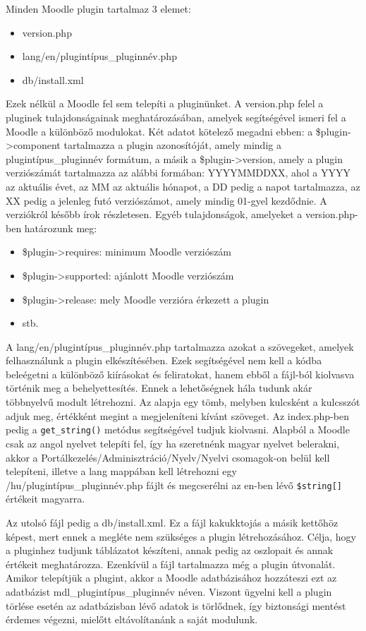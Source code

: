 Minden Moodle plugin tartalmaz 3 elemet:
\begin{itemize}
    \item version.php
    \item lang/en/plugintípus\_pluginnév.php
    \item db/install.xml
\end{itemize}

Ezek nélkül a Moodle fel sem telepíti a pluginünket. A version.php felel a pluginek tulajdonságainak meghatározásában, amelyek segítségével ismeri fel a Moodle a különböző modulokat. Két adatot kötelező megadni ebben: a \$plugin->component tartalmazza a plugin azonosítóját, amely mindig a plugintípus\_pluginnév formátum, a másik a \$plugin->version, amely a plugin verziószámát tartalmazza az alábbi formában: YYYYMMDDXX, ahol a YYYY az aktuális évet, az MM az aktuális hónapot, a DD pedig a napot tartalmazza, az XX pedig a jelenleg futó verziószámot, amely mindig 01-gyel kezdődnie. A verziókról később írok részletesen. Egyéb tulajdonságok, amelyeket a version.php-ben határozunk meg:
\begin{itemize}
    \item \$plugin->requires: minimum Moodle verziószám
    \item \$plugin->supported: ajánlott Moodle verziószám
    \item \$plugin->release: mely Moodle verzióra érkezett a plugin
    \item stb.
\end{itemize}

A lang/en/plugintípus\_pluginnév.php tartalmazza azokat a szövegeket, amelyek felhasználunk a plugin elkészítésében. Ezek segítségével nem kell a kódba beleégetni a különböző kiírásokat és feliratokat, hanem ebből a fájl-ból kiolvasva történik meg a behelyettesítés. Ennek a lehetőségnek hála tudunk akár többnyelvű modult létrehozni. Az alapja egy tömb, melyben kulcsként a kulcsszót adjuk meg, értékként megint a megjeleníteni kívánt szöveget. Az index.php-ben pedig a \texttt{get\_string()} metódus segítségével tudjuk kiolvasni. Alapból a Moodle csak az angol nyelvet telepíti fel, így ha szeretnénk magyar nyelvet belerakni, akkor a Portálkezelés/Adminisztráció/Nyelv/Nyelvi csomagok-on belül kell telepíteni, illetve a lang mappában kell létrehozni egy /hu/plugintípus\_pluginnév.php fájlt és megcserélni az en-ben lévő \texttt{\$string[]} értékeit magyarra. \par

Az utolsó fájl pedig a db/install.xml. Ez a fájl kakukktojás a másik kettőhöz képest, mert ennek a megléte nem szükséges a plugin létrehozásához. Célja, hogy a pluginhez tudjunk táblázatot készíteni, annak pedig az oszlopait és annak értékeit meghatározza. Ezenkívül a fájl tartalmazza még a plugin útvonalát. Amikor telepítjük a plugint, akkor a Moodle adatbázisához hozzáteszi ezt az adatbázist mdl\_plugintípus\_pluginnév néven. Viszont ügyelni kell a plugin törlése esetén az adatbázisban lévő adatok is törlődnek, így biztonsági mentést érdemes végezni, mielőtt eltávolítanánk a saját modulunk.\par

